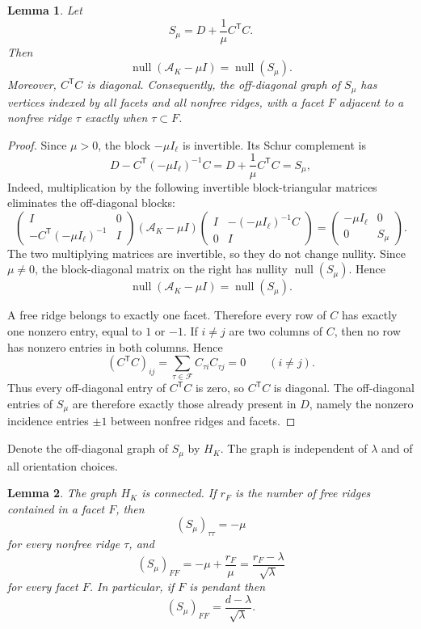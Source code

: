 \documentclass[12pt]{article}
\newtheorem{lemma}{Lemma}
\theoremstyle{remark}
\newcommand{\nullity}{\operatorname{null}}
\begin{document}
\begin{lemma}\label{lem:free-elim}
Let
\[
S_\mu=D+\frac1\mu C^{\mathsf T}C.
\]
Then
\[
\nullity(\mathcal A_K-\mu I)=\nullity(S_\mu).
\]
Moreover, $C^{\mathsf T}C$ is diagonal.  Consequently, the off-diagonal graph of $S_\mu$ has vertices indexed by all facets and all nonfree ridges, with a facet $F$ adjacent to a nonfree ridge $\tau$ exactly when $\tau\subset F$.
\end{lemma}

\begin{proof}
Since $\mu>0$, the block $-\mu I_\ell$ is invertible.  Its Schur complement is
\[
D-C^{\mathsf T}(-\mu I_\ell)^{-1}C
=D+\frac1\mu C^{\mathsf T}C=S_\mu,
\]
Indeed, multiplication by the following invertible block-triangular matrices eliminates the off-diagonal blocks:
\[
\begin{pmatrix}
I&0\\
-C^{\mathsf T}(-\mu I_\ell)^{-1}&I
\end{pmatrix}
(\mathcal A_K-\mu I)
\begin{pmatrix}
I&-(-\mu I_\ell)^{-1}C\\
0&I
\end{pmatrix}
=
\begin{pmatrix}
-\mu I_\ell&0\\
0&S_\mu
\end{pmatrix}.
\]
The two multiplying matrices are invertible, so they do not change nullity.  Since $\mu \ne 0$, the block-diagonal matrix on the right has nullity $\nullity(S_\mu)$.  Hence
\[
\nullity(\mathcal A_K-\mu I)=\nullity(S_\mu).
\]

A free ridge belongs to exactly one facet.  Therefore every row of $C$ has exactly one nonzero entry, equal to $1$ or $-1$.  If $i\ne j$ are two columns of $C$, then no row has nonzero entries in both columns.  Hence
\[
(C^{\mathsf T}C)_{ij}
=\sum_{\tau\in\mathcal F}C_{\tau i}C_{\tau j}=0
\qquad(i\ne j).
\]
Thus every off-diagonal entry of $C^{\mathsf T}C$ is zero, so $C^{\mathsf T}C$ is diagonal.  The off-diagonal entries of $S_\mu$ are therefore exactly those already present in $D$, namely the nonzero incidence entries $\pm1$ between nonfree ridges and facets.
\end{proof}

Denote the off-diagonal graph of $S_\mu$ by $H_K$.  The graph is independent of $\lambda$ and of all orientation choices.

\begin{lemma}\label{lem:HK-diag}
The graph $H_K$ is connected.  If $r_F$ is the number of free ridges contained in a facet $F$, then
\[
(S_\mu)_{\tau\tau}=-\mu
\]
for every nonfree ridge $\tau$, and
\[
(S_\mu)_{FF}=-\mu+\frac{r_F}{\mu}
=\frac{r_F-\lambda}{\sqrt\lambda}
\]
for every facet $F$.  In particular, if $F$ is pendant then
\[
(S_\mu)_{FF}=\frac{d-\lambda}{\sqrt\lambda}.
\]
\end{lemma}
\end{document}
